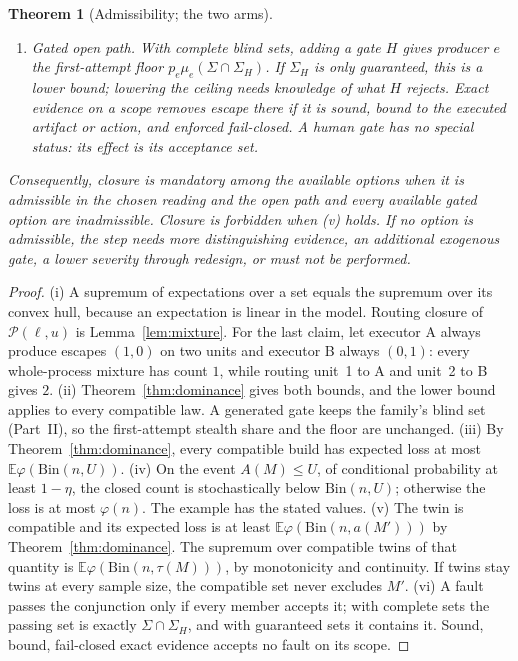 \documentclass[11pt]{article}
\newtheorem{theorem}{Theorem}
\theoremstyle{definition}
\theoremstyle{remark}
\newcommand{\E}{\mathbb E}
\newcommand{\Bin}{\mathrm{Bin}}
\begin{document}
\begin{theorem}[Admissibility; the two arms]
\begin{enumerate}[label=(\roman*),itemsep=2pt]
\item \emph{Gated open path.} With complete blind sets, adding a gate $H$ gives producer $e$ the
first-attempt floor $p_e\mu_e(\Sigma\cap\Sigma_H)$. If $\Sigma_H$ is only guaranteed, this is a lower bound;
lowering the ceiling needs knowledge of what $H$ rejects. Exact evidence on a scope removes escape there
if it is sound, bound to the executed artifact or action, and enforced fail-closed. A human gate has no
special status: its effect is its acceptance set.
\end{enumerate}
Consequently, closure is \emph{mandatory} among the available options when it is admissible in the
chosen reading and the open path and every available gated option are inadmissible. Closure is
\emph{forbidden} when (v) holds. If no option is admissible, the step needs more distinguishing evidence,
an additional exogenous gate, a lower severity through redesign, or must not be performed.
\end{theorem}
\begin{proof}
(i) A supremum of expectations over a set equals the supremum over its convex hull, because an
expectation is linear in the model. Routing closure of $\mathcal P(\ell,u)$ is Lemma~\ref{lem:mixture}.
For the last claim, let executor A always produce escapes $(1,0)$ on two units and executor B always
$(0,1)$: every whole-process mixture has count $1$, while routing unit~1 to A and unit~2 to B gives $2$.
(ii) Theorem~\ref{thm:dominance} gives both bounds, and the lower bound applies to every compatible law.
A generated gate keeps the family's blind set (Part~II), so the first-attempt stealth share and the floor
are unchanged.
(iii) By Theorem~\ref{thm:dominance}, every compatible build has expected loss at most
$\E\varphi(\Bin(n,U))$.
(iv) On the event $A(M)\le U$, of conditional probability at least $1-\eta$, the closed count is
stochastically below $\Bin(n,U)$; otherwise the loss is at most $\varphi(n)$. The example has the stated
values.
(v) The twin is compatible and its expected loss is at least $\E\varphi(\Bin(n,a(M')))$ by
Theorem~\ref{thm:dominance}. The supremum over compatible twins of that quantity is
$\E\varphi(\Bin(n,\tau(M)))$, by monotonicity and continuity. If twins stay twins at every sample size,
the compatible set never excludes $M'$.
(vi) A fault passes the conjunction only if every member accepts it; with complete sets the passing set
is exactly $\Sigma\cap\Sigma_H$, and with guaranteed sets it contains it. Sound, bound, fail-closed exact
evidence accepts no fault on its scope.
\end{proof}
\end{document}
